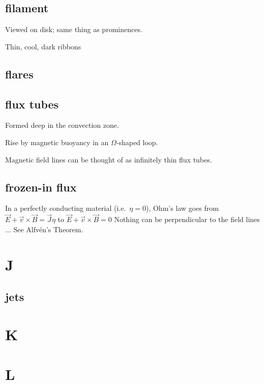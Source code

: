 \documentclass[12pt]{article}
\begin{document}
\subsection*{filament}
    \begin{itemize*}
        \item Viewed on disk; same thing as prominences.
        \item Thin, cool, dark ribbons
    \end{itemize*}

\subsection*{flares}

\subsection*{flux tubes}
    \begin{itemize*}
        \item Formed deep in the convection zone.
        \item Rise by magnetic buoyancy in an $\Omega$-shaped loop.
        \item Magnetic field lines can be thought of as infinitely
          thin flux tubes.
    \end{itemize*}

\subsection*{frozen-in flux}
In a perfectly conducting material (i.e.\ $\eta = 0$),
Ohm's law goes from
$ \vec{E} + \vec{v} \times \vec{B} = \vec{J}\eta $ to
$ \vec{E} + \vec{v} \times \vec{B} = 0 $
Nothing can be perpendicular to the field lines $\ldots$
See Alfv\'en's Theorem.

\section{J}

\subsection*{jets}

\section{K}
\section{L}
\end{document}
